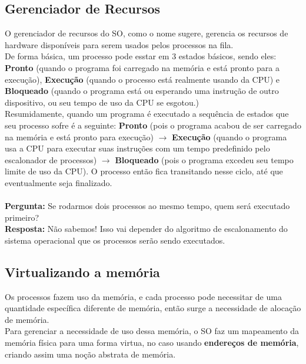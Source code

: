 \documentclass[12pt]{article}
\begin{document}
    \subsection{Gerenciador de Recursos}
    O gerenciador de recursos do SO, como o nome sugere, gerencia os recursos de hardware disponíveis para serem usados pelos processos na fila. 
    \\De forma básica, um processo pode esstar em 3 estados básicos, sendo eles: \textbf{Pronto} (quando o programa foi carregado na memória e está pronto para a execução), \textbf{Execução} (quando o processo está realmente usando da CPU) e \textbf{Bloqueado} (quando o programa está ou esperando uma instrução de outro dispositivo, ou seu tempo de uso da CPU se esgotou.)
    \\Resumidamente, quando um programa é executado a sequência de estados que seu processo sofre é a seguinte: \textbf{Pronto} (pois o programa acabou de ser carregado na memória e está pronto para execução) $\rightarrow$ \textbf{Execução} (quando o programa usa a CPU para executar suas instruções com um tempo predefinido pelo escalonador de processos) $\rightarrow$ 
    \textbf{Bloqueado} (pois o programa excedeu seu tempo limite de uso da CPU). O processo então fica transitando nesse ciclo, até que eventualmente seja finalizado.
    \\~\\\textbf{Pergunta:} Se rodarmos dois processos ao mesmo tempo, quem será executado primeiro?
    \\\textbf{Resposta:} Não sabemos! Isso vai depender do algoritmo de escalonamento do sistema operacional que os processos serão sendo executados.
    
    \subsection{Virtualizando a memória}
    Os processos fazem uso da memória, e cada processo pode necessitar de uma quantidade específica diferente de memória, então surge a necessidade de alocação de memória.
    \\Para gerenciar a necessidade de uso dessa memória, o SO faz um mapeamento da memória física para uma forma virtua, no caso usando \textbf{endereços de memória}, criando assim uma noção abstrata de memória.
\end{document}
